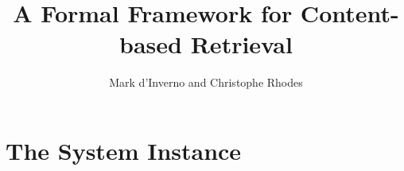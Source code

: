 \documentclass[11pt]{article}
\title{A Formal Framework for Content-based Retrieval}
\author{Mark d'Inverno and Christophe Rhodes}
\begin{document}
\maketitle



\section{The System Instance}

\newcommand{\LET}{\mathrel{\sf Let}}

\newcommand{\mylet}{\methrel{\sf Let}}
\newcommand{\FV}{\mathrel{~FV}}
\newcommand{\V}{\mathrel{~FV^{d}}}
\newcommand{\U}{\mathrel{~FV^{1}}}
\newcommand{\R}{\mathrel{~R}}

\newcommand{\mylog}{\mathrel{ln}}
\end{document}
